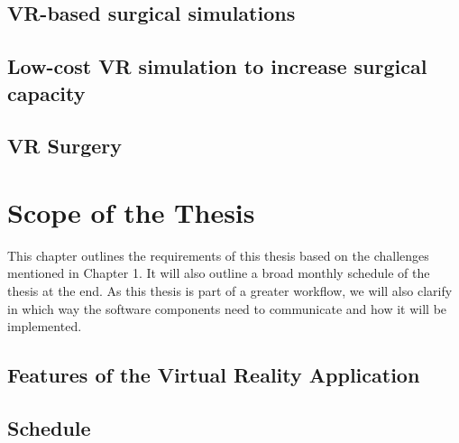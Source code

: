 \documentclass[twoside, parskip]{VRThesis} %
\begin{document}
\section{\label{sec::RelatedWork1}VR-based surgical simulations}


\section{\label{sec::RelatedWork2}Low-cost VR simulation to increase surgical capacity}


\section{\label{sec::RelatedWork3}VR Surgery}


\chapter{Scope of the Thesis}

This chapter outlines the requirements of this thesis based on the challenges mentioned in Chapter 1.
It will also outline a broad monthly schedule of the thesis at the end.
As this thesis is part of a greater workflow, we will also clarify in which way the software components need to communicate and how it will be implemented.

\section{\label{sec::Features}Features of the Virtual Reality Application}


\section{Schedule}




%
\end{document}

